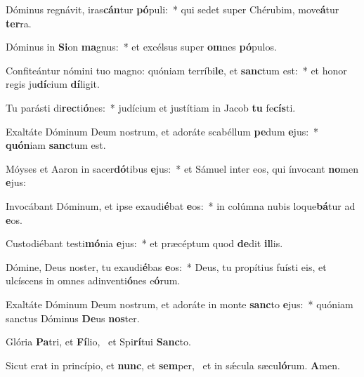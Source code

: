 \item Dóminus regnávit, iras\textbf{cán}tur \textbf{pó}puli:~* qui sedet super Chérubim, move\textbf{á}tur \textbf{ter}ra.
\item Dóminus in \textbf{Si}on \textbf{ma}gnus:~* et excélsus super \textbf{om}nes \textbf{pó}pulos.
\item Confiteántur nómini tuo magno: quóniam terríbi\textbf{le}, et \textbf{sanc}tum est:~* et honor regis ju\textbf{dí}cium \textbf{dí}ligit.
\item Tu parásti di\textbf{rec}ti\textbf{ó}nes:~* judícium et justítiam in Jacob \textbf{tu} fe\textbf{cís}ti.
\item Exaltáte Dóminum Deum nostrum, et adoráte scabéllum \textbf{pe}dum \textbf{e}jus:~* \textbf{quón}iam \textbf{sanc}tum est.
\item Móyses et Aaron in sacer\textbf{dó}tibus \textbf{e}jus:~* et Sámuel inter eos, qui ínvocant \textbf{no}men \textbf{e}jus:
\item Invocábant Dóminum, et ipse exaudi\textbf{é}bat \textbf{e}os:~* in colúmna nubis loque\textbf{bá}tur ad \textbf{e}os.
\item Custodiébant testi\textbf{mó}nia \textbf{e}jus:~* et præcéptum quod \textbf{de}dit \textbf{il}lis.
\item Dómine, Deus noster, tu exaudi\textbf{é}bas \textbf{e}os:~* Deus, tu propítius fuísti eis, et ulcíscens in omnes adinventi\textbf{ó}nes e\textbf{ó}rum.
\item Exaltáte Dóminum Deum nostrum, et adoráte in monte \textbf{sanc}to \textbf{e}jus:~* quóniam sanctus Dóminus \textbf{De}us \textbf{nos}ter.
\item Glória \textbf{Pa}tri, et \textbf{Fí}lio,~\psstar{} et Spi\textbf{rí}tui \textbf{Sanc}to.
\item Sicut erat in princípio, et \textbf{nunc}, et \textbf{sem}per,~\psstar{} et in sǽcula sæcu\textbf{ló}rum. \textbf{A}men.
